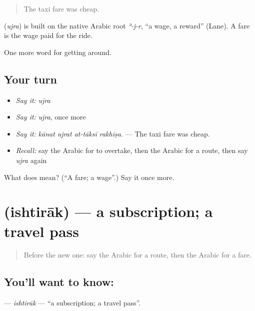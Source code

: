 \begin{quote}
The taxi fare was cheap.
\end{quote}

\begin{cousinweb}
\textbf{} (\emph{ujra}) is built on the native Arabic root \emph{ʾ-j-r}, \textquotedblleft{}a wage, a reward\textquotedblright{} (Lane). A fare is the wage paid for the ride.
\end{cousinweb}

\begin{grammarlens}[title={What you've built}]
One more word for getting around.
\end{grammarlens}

\subsection*{Your turn}
\begin{itemize}
\raggedright
  \item \emph{Say it:} \emph{ujra}
  \item \emph{Say it:} \emph{ujra}, once more
  \item \emph{Say it:} \emph{kānat ujrat at-tāksī rakhīṣa.} — The taxi fare was cheap.
  \item \emph{Recall:} say the Arabic for to overtake, then the Arabic for a route, then say \emph{ujra} again
\end{itemize}

\begin{tcolorbox}[breakable,colback=teal!4,colframe=teal!35!black,title={Before you move on}]
What does  mean? (\textquotedblleft{}A fare; a wage\textquotedblright{}.) Say it once more.
\end{tcolorbox}
\section[\texorpdfstring{\ar{اشتراك} (ishtirāk)}{اشتراك (ishtirāk)}]{ (ishtirāk) — a subscription; a travel pass}

\label{lesson:AR-C435-ishtirak}



\begin{quote}
Before the new one: say the Arabic for a route, then the Arabic for a fare.
\end{quote}

\subsection*{You'll want to know: }
\textbf{} — \emph{ishtirāk} — \textquotedblleft{}a subscription; a travel pass\textquotedblright{}.

